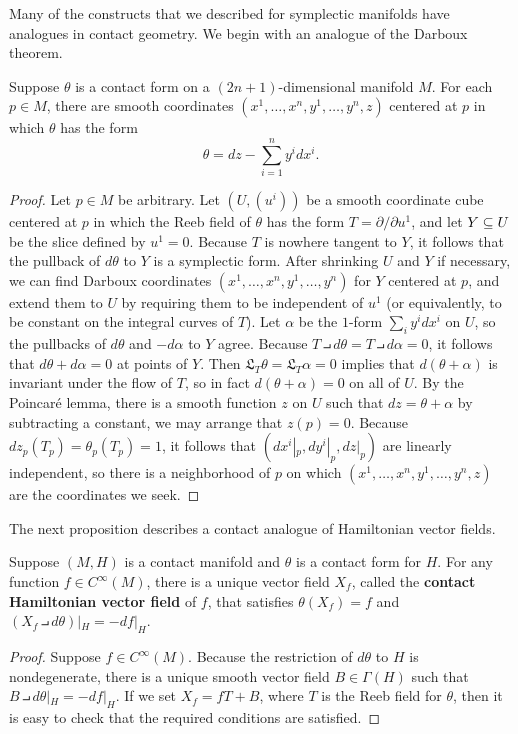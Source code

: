 Many of the constructs that we described for symplectic manifolds have analogues in contact geometry. We begin with an analogue of the Darboux theorem.

\begin{theorem}
Suppose $\theta$ is a contact form on a $(2n+1)$-dimensional manifold $M$. For each $p\in M$, there are smooth coordinates $(x^1,\dots,x^n,y^1,\dots,y^n,z)$ centered at $p$ in which $\theta$ has the form
\[\theta=dz-\sum_{i=1}^{n}y^idx^i.\]
\end{theorem}
\begin{proof}
Let $p\in M$ be arbitrary. Let $(U,(u^i))$ be a smooth coordinate cube centered at $p$ in which the Reeb field of $\theta$ has the form $T=\partial/\partial u^1$, and let $Y\subseteq U$ be the slice defined by $u^1=0$. Because $T$ is nowhere tangent to $Y$, it follows that the pullback of $d\theta$ to $Y$ is a symplectic form. After shrinking $U$ and $Y$ if necessary, we can find Darboux coordinates $(x^1,\dots,x^n,y^1,\dots,y^n)$ for $Y$ centered at $p$, and extend them to $U$ by requiring them to be independent of $u^1$ (or equivalently, to be constant on the integral curves of $T$). Let $\alpha$ be the $1$-form $\sum_iy^idx^i$ on $U$, so the pullbacks of $d\theta$ and $-d\alpha$ to $Y$ agree. Because $T\intprod d\theta=T\intprod d\alpha=0$, it follows that $d\theta+d\alpha=0$ at points of $Y$. Then $\mathfrak{L}_T\theta=\mathfrak{L}_T\alpha=0$ implies that $d(\theta+\alpha)$ is invariant under the flow of $T$, so in fact $d(\theta+\alpha)=0$ on all of $U$. By the Poincar\'e lemma, there is a smooth function $z$ on $U$ such that $dz=\theta+\alpha$ by subtracting a constant, we may arrange that $z(p)=0$. Because $dz_p(T_p)=\theta_p(T_p)=1$, it follows that $(dx^i|_p,dy^i|_p,dz|_p)$ are linearly independent, so there is a neighborhood of $p$ on which $(x^1,\dots,x^n,y^1,\dots,y^n,z)$ are the coordinates we seek.
\end{proof}

The next proposition describes a contact analogue of Hamiltonian vector fields.

\begin{proposition}\label{contact Hamiltonian vector field}
Suppose $(M,H)$ is a contact manifold and $\theta$ is a contact form for $H$. For any function $f\in C^\infty(M)$, there is a unique vector field $X_f$, called the \textbf{contact Hamiltonian vector field} of $f$, that satisfies $\theta(X_f)=f$ and $(X_f\intprod d\theta)|_H=-df|_H$.
\end{proposition}
\begin{proof}
Suppose $f\in C^\infty(M)$. Because the restriction of $d\theta$ to $H$ is nondegenerate, there is a unique smooth vector field $B\in\Gamma(H)$ such that $B\intprod d\theta|_H=-df|_H$. If we set $X_f=fT+B$, where $T$ is the Reeb field for $\theta$, then it is easy to check that the required conditions are satisfied.
\end{proof}

